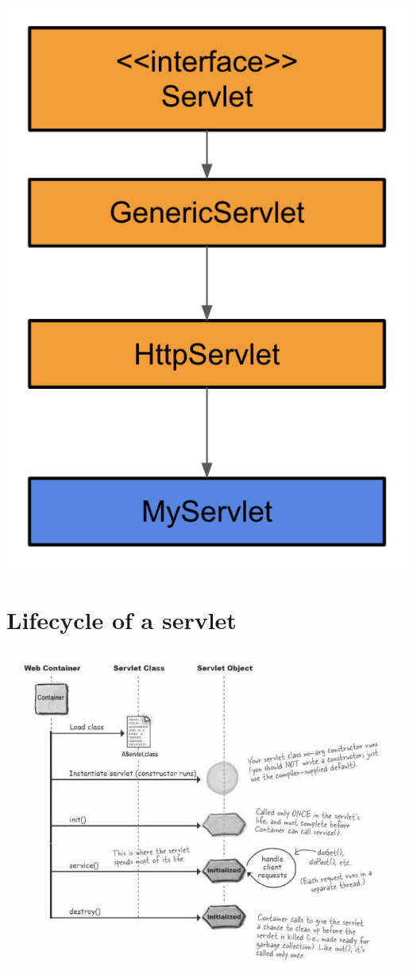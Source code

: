 \includegraphics{./images/chapter8/servlet_hierarchy}


\section{Lifecycle of a servlet}

\includegraphics[width=\textwidth]{./images/chapter8/servlet_lifecycle}

